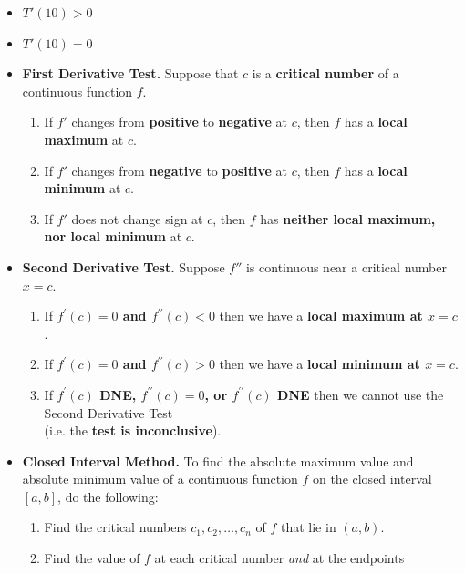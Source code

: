\documentclass[11pt]{article}
\begin{document}
\begin{enumerate}
\begin{enumerate}
\begin{minipage}[t][1.5in]{0.2\textwidth}
\begin{itemize}
        \item[E.] $T'(10)>0$
            \vfill

        \item[F.] $T'(10)=0$
            \vfill
        
        \end{itemize}
    \end{minipage}        
        
\end{enumerate}
\newpage
\begin{itemize}
\item\textbf{First Derivative Test.}
Suppose that $c$ is a
\textbf{critical number}
of a continuous function $f$.
\begin{enumerate}
\item
If $f'$ changes from
\textbf{positive}
to
\textbf{negative}
at $c$, then $f$ has a
\textbf{local maximum} at $c$.
\item
If $f'$ changes from
\textbf{negative}
to
\textbf{positive}
at $c$, then $f$ has a
\textbf{local minimum}
at $c$.
\item
If $f'$ does not change sign at $c$,
then $f$ has
\textbf{neither local maximum, nor local minimum}
at $c$.
\end{enumerate}
\vfill
\item\textbf{Second Derivative Test.}
Suppose $f''$ is continuous near a critical number $x=c$.
\begin{enumerate}
\item
If \textbf{$f^{\prime}(c)=0$ and $f^{\prime\prime}(c)<0$}
then we have a
\textbf{local maximum at $x=c$}.
\item
If \textbf{$f^{\prime}(c)=0$ and $f^{\prime\prime}(c)>0$}
then we have a
\textbf{local minimum at $x=c$}.
\item
If \textbf{$f^{\prime}(c)$ DNE,
$f^{\prime\prime}(c)=0$, or
$f^{\prime\prime}(c)$ DNE}
then we cannot use the Second Derivative Test\\
(i.e. the \textbf{test is inconclusive}).
\end{enumerate}
\vfill
\item
\textbf{Closed Interval Method.}
To find the absolute maximum value and absolute minimum value of a continuous function $f$ on the closed interval $[a, b]$, do the following:
\smallskip

\begin{minipage}{0.75\textwidth}
\begin{enumerate}
\item  Find the critical numbers $c_1, c_2, \ldots, c_n$ of $f$ that lie in $(a, b)$.
\item  Find the value of $f$ at each critical number {\em and} at the endpoints



\end{enumerate}
\end{minipage}
\end{itemize}
\end{enumerate}
\end{document}

